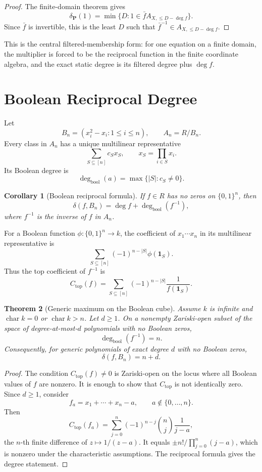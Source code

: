 \documentclass[11pt]{article}
\newtheorem{theorem}{Theorem}[section]
\newtheorem{corollary}[theorem]{Corollary}
\DeclareMathOperator{\charac}{char}
\begin{document}
\begin{proof}
The finite-domain theorem gives
\[
\delta_{\mathbf P}(1)
=
\min\{D:1\in \bar f A_{X,\le D-\deg f}\}.
\]
Since \(\bar f\) is invertible, this is the least \(D\) such that \(\bar f^{-1}\in A_{X,\le D-\deg f}\).
\end{proof}

This is the central filtered-membership form: for one equation on a finite domain, the multiplier is forced to be the reciprocal function in the finite coordinate algebra, and the exact static degree is its filtered degree plus \(\deg f\).

\section{Boolean Reciprocal Degree}

Let
\[
B_n=(x_i^2-x_i:1\le i\le n),\qquad A_n=R/B_n.
\]
Every class in \(A_n\) has a unique multilinear representative
\[
\sum_{S\subseteq[n]}c_Sx_S,\qquad x_S=\prod_{i\in S}x_i.
\]
Its Boolean degree is
\[
\deg_{\mathrm{bool}}(a)=\max\{|S|:c_S\ne0\}.
\]

\begin{corollary}[Boolean reciprocal formula]
If \(f\in R\) has no zeros on \(\{0,1\}^n\), then
\[
\delta(f,B_n)=\deg f+\deg_{\mathrm{bool}}(f^{-1}),
\]
where \(f^{-1}\) is the inverse of \(f\) in \(A_n\).
\end{corollary}

For a Boolean function \(\phi:\{0,1\}^n\to k\), the coefficient of \(x_1\cdots x_n\) in its multilinear representative is
\[
\sum_{S\subseteq[n]}(-1)^{n-|S|}\phi(\mathbf 1_S).
\]
Thus the top coefficient of \(f^{-1}\) is
\[
C_{\mathrm{top}}(f)
=
\sum_{S\subseteq[n]}
(-1)^{n-|S|}
\frac{1}{f(\mathbf 1_S)}.
\]

\begin{theorem}[Generic maximum on the Boolean cube]
Assume \(k\) is infinite and \(\charac k=0\) or \(\charac k>n\). Let \(d\ge1\). On a nonempty Zariski-open subset of the space of degree-at-most-\(d\) polynomials with no Boolean zeros,
\[
\deg_{\mathrm{bool}}(f^{-1})=n.
\]
Consequently, for generic polynomials of exact degree \(d\) with no Boolean zeros,
\[
\delta(f,B_n)=n+d.
\]
\end{theorem}

\begin{proof}
The condition \(C_{\mathrm{top}}(f)\ne0\) is Zariski-open on the locus where all Boolean values of \(f\) are nonzero. It is enough to show that \(C_{\mathrm{top}}\) is not identically zero. Since \(d\ge1\), consider
\[
f_a=x_1+\cdots+x_n-a,\qquad a\notin\{0,\ldots,n\}.
\]
Then
\[
C_{\mathrm{top}}(f_a)
=
\sum_{j=0}^n(-1)^{n-j}\binom nj\frac1{j-a},
\]
the \(n\)-th finite difference of \(z\mapsto 1/(z-a)\). It equals \(\pm n!/\prod_{j=0}^n(j-a)\), which is nonzero under the characteristic assumptions. The reciprocal formula gives the degree statement.
\end{proof}
\end{document}
